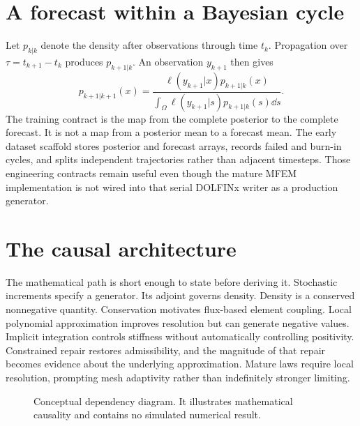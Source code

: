 \section{A forecast within a Bayesian cycle}
Let $p_{k|k}$ denote the density after observations through time $t_k$. Propagation over $\tau=t_{k+1}-t_k$ produces $p_{k+1|k}$. An observation $y_{k+1}$ then gives
\begin{equation}\label{eq:bayes-overview}
p_{k+1|k+1}(x)=\frac{\ell(y_{k+1}|x)p_{k+1|k}(x)}{\int_\Omega \ell(y_{k+1}|s)p_{k+1|k}(s)\dd s}.
\end{equation}
The training contract is the map from the complete posterior to the complete forecast. It is not a map from a posterior mean to a forecast mean. The early dataset scaffold stores posterior and forecast arrays, records failed and burn-in cycles, and splits independent trajectories rather than adjacent timesteps. Those engineering contracts remain useful even though the mature MFEM implementation is not wired into that serial DOLFINx writer as a production generator.

\section{The causal architecture}
The mathematical path is short enough to state before deriving it. Stochastic increments specify a generator. Its adjoint governs density. Density is a conserved nonnegative quantity. Conservation motivates flux-based element coupling. Local polynomial approximation improves resolution but can generate negative values. Implicit integration controls stiffness without automatically controlling positivity. Constrained repair restores admissibility, and the magnitude of that repair becomes evidence about the underlying approximation. Mature laws require local resolution, prompting mesh adaptivity rather than indefinitely stronger limiting.

\begin{figure}[ht]\centering
{}
\caption{Conceptual dependency diagram. It illustrates mathematical causality and contains no simulated numerical result.}\label{fig:causality}
\end{figure}

